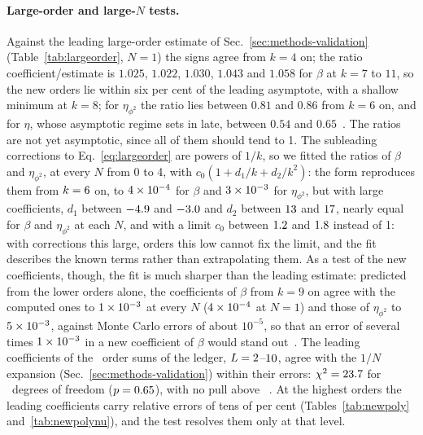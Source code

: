 \paragraph{Large-order and large-$N$ tests.}
Against the leading large-order estimate of Sec.~\ref{sec:methods-validation} (Table~\ref{tab:largeorder}, $N=1$) the signs agree from $k=4$ on; the ratio coefficient/estimate is
$1.025$, $1.022$, $1.030$, $1.043$ and $1.058$ for $\beta$ at $k=7$ to $11$, so the new orders lie within six per cent
of the leading asymptote, with a shallow minimum at $k=8$; for $\eta_{\phi^2}$ the ratio lies between $0.81$ and $0.86$ from
$k=6$ on, and for $\eta$, whose asymptotic regime sets in late, between $0.54$ and $0.65$~. The ratios are
not yet asymptotic, since all of them should tend to 1. The subleading corrections to Eq.~\eqref{eq:largeorder} are
powers of $1/k$, so we fitted the ratios of $\beta$ and $\eta_{\phi^2}$, at every $N$ from 0 to 4, with
$c_0(1+d_1/k+d_2/k^2)$: the form reproduces them from $k=6$ on, to $4\times10^{-4}$ for $\beta$ and
$3\times10^{-3}$ for $\eta_{\phi^2}$, but with large coefficients, $d_1$ between $-4.9$ and $-3.0$
and $d_2$ between $13$ and $17$, nearly equal for $\beta$ and $\eta_{\phi^2}$ at each $N$, and
with a limit $c_0$ between $1.2$ and $1.8$ instead of 1: with corrections this large, orders this low
cannot fix the limit, and the fit describes the known terms rather than extrapolating them. As a test of the new
coefficients, though, the fit is much sharper than the leading estimate: predicted from the lower orders alone, the coefficients
of $\beta$ from $k=9$ on agree with the computed ones to $1\times10^{-3}$ at every $N$ ($4\times10^{-4}$ at
$N=1$) and those of $\eta_{\phi^2}$ to $5\times10^{-3}$, against Monte Carlo errors of about $10^{-5}$, so that an error
of several times $1\times10^{-3}$ in a new coefficient of $\beta$ would stand out~.
The leading coefficients of the \largeNorders\ order sums of the ledger,
$L=2$--$10$, agree with the $1/N$ expansion (Sec.~\ref{sec:methods-validation}) within their errors: $\chi^2=23.7$ for \largeNorders\ degrees
of freedom ($p=0.65$), with no pull above \largeNzmax~. At the highest orders the leading
coefficients carry relative errors of tens of per cent (Tables~\ref{tab:newpoly} and~\ref{tab:newpolynu}), and the
test resolves them only at that level.

\begin{table}
\caption{\label{tab:largeorder}%
Large-order test at $N=1$: the coefficient of $\ubar^k$ in $\beta$, $\eta$ and $\eta_{\phi^2}$ divided by its leading
large-order estimate (Sec.~\ref{sec:methods-validation}). Generated from the ledger~.}
\end{table}



